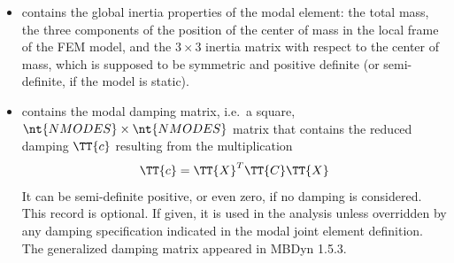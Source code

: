 \begin{itemize}
\item {} contains the global inertia properties
of the modal element: the total mass, the three components 
of the position of the center of mass in the local frame
of the FEM model, and the $3\times{3}$ inertia matrix
with respect to the center of mass, which is supposed
to be symmetric and positive definite (or semi-definite,
if the model is static).

\item {} contains the modal damping matrix,
i.e.\ a square, $\nt{NMODES} \times \nt{NMODES}$ matrix that contains
the reduced damping
$\TT{c}$
resulting from the multiplication
\begin{equation}
	\TT{c} = \TT{X}^T \TT{C} \TT{X}
\end{equation}
It can be semi-definite positive, or even zero, if no damping is considered.
This record is optional.
If given, it is used in the analysis unless overridden by any damping
specification indicated in the modal joint element definition.
The generalized damping matrix appeared in MBDyn 1.5.3.


\end{itemize}
